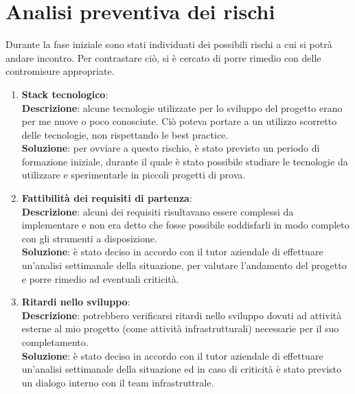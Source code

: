 \section{Analisi preventiva dei rischi}
Durante la fase iniziale sono stati individuati dei possibili rischi a cui si potrà andare incontro. Per contrastare ciò, si è cercato di porre rimedio con delle contromisure appropriate.
\begin{enumerate}
    \item \textbf{Stack tecnologico}:\\
        \textbf{Descrizione}: alcune tecnologie utilizzate per lo sviluppo del progetto erano per me nuove o poco conosciute. Ciò poteva portare a un utilizzo scorretto delle tecnologie, non rispettando le best practice.\\
        \textbf{Soluzione}: per ovviare a questo rischio, è stato previsto un periodo di formazione iniziale, durante il quale è stato possibile studiare le tecnologie da utilizzare e sperimentarle in piccoli progetti di prova.\\
    \item \textbf{Fattibilità dei requisiti di partenza}:\\
        \textbf{Descrizione}: alcuni dei requisiti risultavano essere complessi da implementare e non era detto che fosse possibile soddisfarli in modo completo con gli strumenti a disposizione.\\
        \textbf{Soluzione}: è stato deciso in accordo con il tutor aziendale di effettuare un'analisi settimanale della situazione, per valutare l'andamento del progetto e porre rimedio ad eventuali criticità.\\
    \item \textbf{Ritardi nello sviluppo}:\\
        \textbf{Descrizione}: potrebbero verificarsi ritardi nello sviluppo dovuti ad attività esterne al mio progetto (come attività infrastrutturali) necessarie per il suo completamento.\\
        \textbf{Soluzione}: è stato deciso in accordo con il tutor aziendale di effettuare un'analisi settimanale della situazione ed in caso di criticità è stato previsto un dialogo interno con il team infrastruttrale.\\
\end{enumerate}








